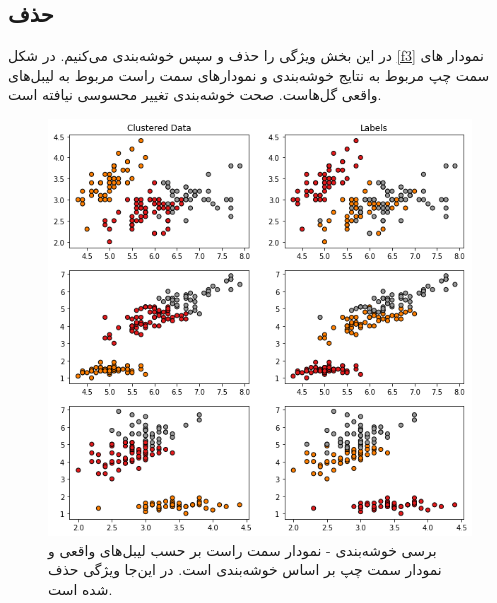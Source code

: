 \documentclass[a4paper]{article}
\begin{document}
\begin{large}
\subsection{حذف 
}
در این بخش ویژگی 
را حذف و سپس خوشه‌بندی می‌کنیم.
در شکل
\eqref{f3}
نمودار های سمت چپ مربوط به نتایج خوشه‌بندی و نمودار‌های سمت  راست مربوط به لیبل‌های واقعی گل‌هاست. صحت خوشه‌بندی تغییر محسوسی نیافته است.
\begin{figure}[h!]
	\centering
	\includegraphics[scale=0.6]{f4.png}
	\caption{برسی خوشه‌بندی - نمودار سمت راست بر حسب لیبل‌های واقعی و نمودار سمت چپ بر اساس خوشه‌بندی 
		است. در این‌جا ویژگی  
		حذف شده است.
	}
	\label{f4}
\end{figure}
\newpage

\end{large}
\end{document}
